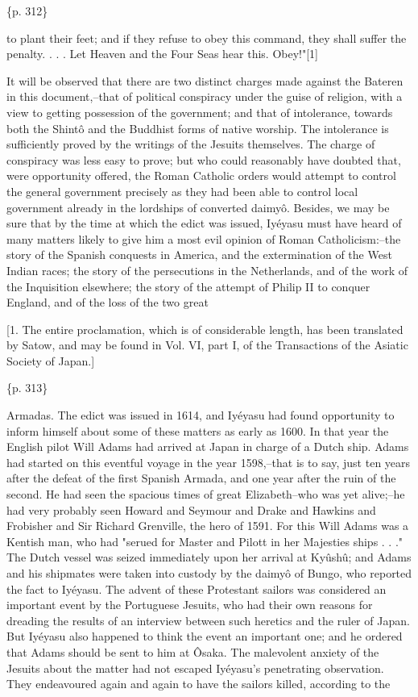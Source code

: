 \{p. 312\}

to plant their feet; and if they refuse to obey this command, they shall suffer the penalty. . . . Let Heaven and the Four Seas hear this. Obey!"[1]

It will be observed that there are two distinct charges made against the Bateren in this document,--that of political conspiracy under the guise of religion, with a view to getting possession of the government; and that of intolerance, towards both the Shintô and the Buddhist forms of native worship. The intolerance is sufficiently proved by the writings of the Jesuits themselves. The charge of conspiracy was less easy to prove; but who could reasonably have doubted that, were opportunity offered, the Roman Catholic orders would attempt to control the general government precisely as they had been able to control local government already in the lordships of converted daimyô. Besides, we may be sure that by the time at which the edict was issued, Iyéyasu must have heard of many matters likely to give him a most evil opinion of Roman Catholicism:--the story of the Spanish conquests in America, and the extermination of the West Indian races; the story of the persecutions in the Netherlands, and of the work of the Inquisition elsewhere; the story of the attempt of Philip II to conquer England, and of the loss of the two great

[1. The entire proclamation, which is of considerable length, has been translated by Satow, and may be found in Vol. VI, part I, of the Transactions of the Asiatic Society of Japan.]

\{p. 313\}

Armadas. The edict was issued in 1614, and Iyéyasu had found opportunity to inform himself about some of these matters as early as 1600. In that year the English pilot Will Adams had arrived at Japan in charge of a Dutch ship. Adams had started on this eventful voyage in the year 1598,--that is to say, just ten years after the defeat of the first Spanish Armada, and one year after the ruin of the second. He had seen the spacious times of great Elizabeth--who was yet alive;--he had very probably seen Howard and Seymour and Drake and Hawkins and Frobisher and Sir Richard Grenville, the hero of 1591. For this Will Adams was a Kentish man, who had "serued for Master and Pilott in her Majesties ships . . ." The Dutch vessel was seized immediately upon her arrival at Kyûshû; and Adams and his shipmates were taken into custody by the daimyô of Bungo, who reported the fact to Iyéyasu. The advent of these Protestant sailors was considered an important event by the Portuguese Jesuits, who had their own reasons for dreading the results of an interview between such heretics and the ruler of Japan. But Iyéyasu also happened to think the event an important one; and he ordered that Adams should be sent to him at Ôsaka. The malevolent anxiety of the Jesuits about the matter had not escaped Iyéyasu's penetrating observation. They endeavoured again and again to have the sailors killed, according to the

